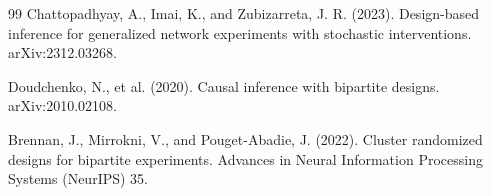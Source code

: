 \documentclass{article}
\begin{document}
\begin{thebibliography}{99}
   Chattopadhyay, A., Imai, K., and Zubizarreta, J. R. (2023). Design-based inference for generalized network experiments with stochastic interventions. arXiv:2312.03268.

   Doudchenko, N., et al. (2020). Causal inference with bipartite designs. arXiv:2010.02108.

   Brennan, J., Mirrokni, V., and Pouget-Abadie, J. (2022). Cluster randomized designs for bipartite experiments. Advances in Neural Information Processing Systems (NeurIPS) 35.

\end{thebibliography}
\end{document}
